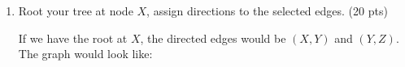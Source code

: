 \documentclass[a4paper]{article}
\theoremstyle{definition}
\newenvironment{soln}{
    \leavevmode\color{blue}\ignorespaces
}{}
\begin{document}
\begin{enumerate}
	\item Root your tree at node $X$, assign directions to the selected edges. (20 pts)
	\begin{soln}
		If we have the root at $ X $, the directed edges would be $ (X,Y) $ and $ (Y,Z) $. The graph would look like:
		\begin{figure}[h]
		\end{figure}
	\end{soln}
\end{enumerate}
\end{document}
